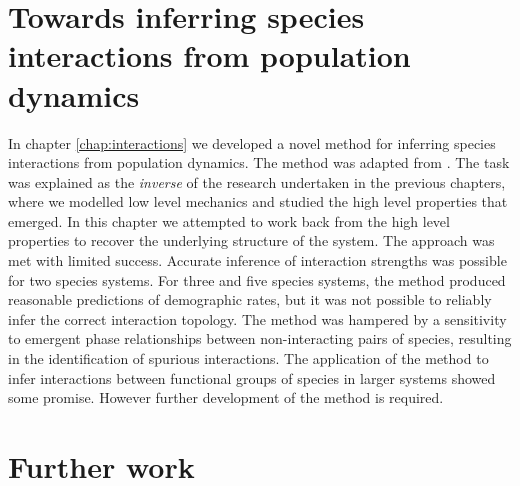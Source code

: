 \section{Towards inferring species interactions from population dynamics}
\label{sec:tisifpd}

In chapter \ref{chap:interactions} we developed a novel method for inferring species interactions from population dynamics. The method was adapted from \cite{shandilya2011inferring}. The task was explained as the \emph{inverse} of the research undertaken in the previous chapters, where we modelled low level mechanics and studied the high level properties that emerged. In this chapter we attempted to work back from the high level properties to recover the underlying structure of the system. The approach was met with limited success. Accurate inference of interaction strengths was possible for two species systems. For three and five species systems, the method produced reasonable predictions of demographic rates, but it was not possible to reliably infer the correct interaction topology. The method was hampered by a sensitivity to emergent phase relationships between non-interacting pairs of species, resulting in the identification of spurious interactions. The application of the method to infer interactions between functional groups of species in larger systems showed some promise. However further development of the method is required. 


\section{Further work}
\label{sec:further_work}

